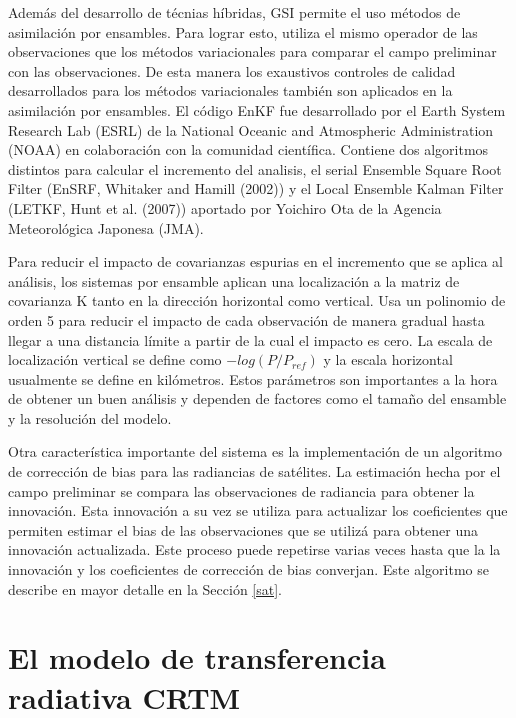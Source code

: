 \documentclass[12pt,twoside]{reedthesis}
\begin{document}
Además del desarrollo de técnias híbridas, GSI permite el uso métodos de asimilación por ensambles. Para lograr esto, utiliza el mismo operador de las observaciones que los métodos variacionales para comparar el campo preliminar con las observaciones.
De esta manera los exaustivos controles de calidad desarrollados para los métodos variacionales también son aplicados en la asimilación por ensambles.
El código EnKF fue desarrollado por el Earth System Research Lab (ESRL) de la National Oceanic and Atmospheric Administration (NOAA) en colaboración con la comunidad científica.
Contiene dos algoritmos distintos para calcular el incremento del analisis, el serial Ensemble Square Root Filter (EnSRF, Whitaker and Hamill (2002)) y el Local Ensemble Kalman Filter (LETKF, Hunt et al. (2007)) aportado por Yoichiro Ota de la Agencia Meteorológica Japonesa (JMA).

Para reducir el impacto de covarianzas espurias en el incremento que se aplica al análisis, los sistemas por ensamble aplican una localización a la matriz de covarianza K tanto en la dirección horizontal como vertical.
Usa un polinomio de orden 5 para reducir el impacto de cada observación de manera gradual hasta llegar a una distancia límite a partir de la cual el impacto es cero. La escala de localización vertical se define como \(-log(P/P_{ref})\) y la escala horizontal usualmente se define en kilómetros.
Estos parámetros son importantes a la hora de obtener un buen análisis y dependen de factores como el tamaño del ensamble y la resolución del modelo.

Otra característica importante del sistema es la implementación de un algoritmo de corrección de bias para las radiancias de satélites.
La estimación hecha por el campo preliminar se compara las observaciones de radiancia para obtener la innovación.
Esta innovación a su vez se utiliza para actualizar los coeficientes que permiten estimar el bias de las observaciones que se utilizá para obtener una innovación actualizada. Este proceso puede repetirse varias veces hasta que la la innovación y los coeficientes de corrección de bias converjan.
Este algoritmo se describe en mayor detalle en la Sección \ref{sat}.

\hypertarget{el-modelo-de-transferencia-radiativa-crtm}{%
\section{El modelo de transferencia radiativa CRTM}\label{el-modelo-de-transferencia-radiativa-crtm}}
\end{document}
